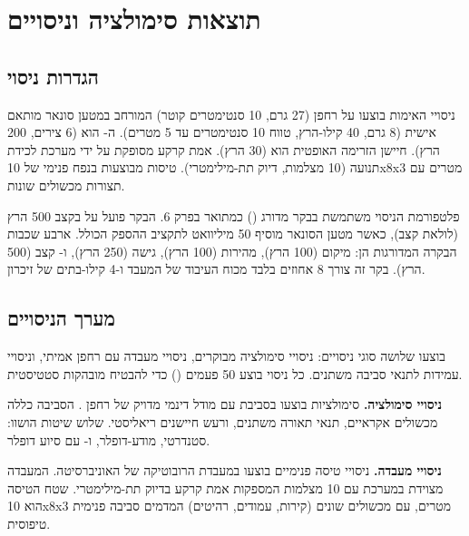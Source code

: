 

\section{תוצאות סימולציה וניסויים}
\label{sec:ch08_results}

\subsection{הגדרות ניסוי}
\label{sec:ch08_experimental_setup}

ניסויי האימות בוצעו על רחפן  (27 גרם, 10 סנטימטרים קוטר) המורחב במטען סונאר מותאם אישית (8 גרם, 40 קילו-הרץ, טווח 10 סנטימטרים עד 5 מטרים). ה- הוא  (6 צירים, 200 הרץ). חיישן הזרימה האופטית הוא  (30 הרץ). אמת קרקע מסופקת על ידי מערכת לכידת תנועה  (10 מצלמות, דיוק תת-מילימטרי). טיסות מבוצעות בנפח פנימי של 10x8x3 מטרים עם תצורות מכשולים שונות.

פלטפורמת הניסוי משתמשת בבקר  מדורג () כמתואר בפרק 6. הבקר פועל על  בקצב 500 הרץ (לולאת קצב), כאשר מטען הסונאר מוסיף 50 מיליוואט לתקציב ההספק הכולל. ארבע שכבות הבקרה המדורגות הן:  מיקום (100 הרץ),  מהירות (100 הרץ),  גישה (250 הרץ), ו- קצב (500 הרץ). בקר זה צורך 8 אחוזים בלבד מכוח העיבוד של המעבד ו-4 קילו-בתים של זיכרון.

\subsection{מערך הניסויים}
\label{sec:ch08_experimental_design}

בוצעו שלושה סוגי ניסויים: ניסויי סימולציה מבוקרים, ניסויי מעבדה עם רחפן אמיתי, וניסויי עמידות לתנאי סביבה משתנים. כל ניסוי בוצע 50 פעמים () כדי להבטיח מובהקות סטטיסטית.

\textbf{ניסויי סימולציה.} סימולציות בוצעו בסביבת  עם מודל דינמי מדויק של רחפן . הסביבה כללה מכשולים אקראיים, תנאי תאורה משתנים, ורעש חיישנים ריאליסטי. שלוש שיטות הושוו:  סטנדרטי,  מודע-דופלר, ו- עם סיוע דופלר.

\textbf{ניסויי מעבדה.} ניסויי טיסה פנימיים בוצעו במעבדת הרובוטיקה של האוניברסיטה. המעבדה מצוידת במערכת  עם 10 מצלמות המספקות אמת קרקע בדיוק תת-מילימטרי. שטח הטיסה הוא 10x8x3 מטרים, עם מכשולים שונים (קירות, עמודים, רהיטים) המדמים סביבה פנימית טיפוסית.

